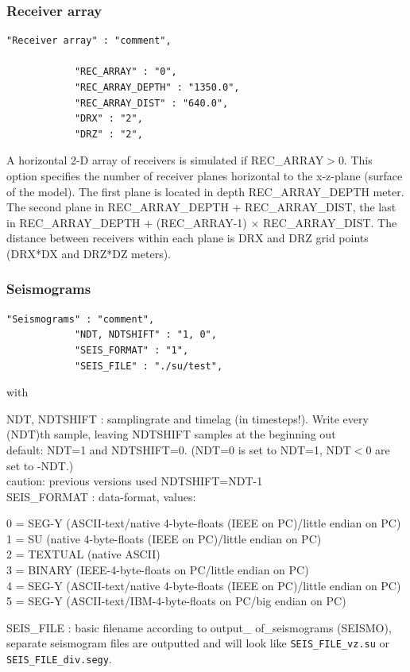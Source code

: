 \documentclass[11pt,onecolumn,oneside]{article}
\begin{document}
\subsubsection{Receiver array}
\begin{verbatim}
"Receiver array" : "comment",

            "REC_ARRAY" : "0",
            "REC_ARRAY_DEPTH" : "1350.0",
            "REC_ARRAY_DIST" : "640.0", 
            "DRX" : "2",
            "DRZ" : "2",
\end{verbatim}

A horizontal 2-D array of receivers is simulated if REC\_ARRAY$>$0. This option specifies the number of receiver planes horizontal to the x-z-plane (surface of the model). The first plane is located in depth REC\_ARRAY\_DEPTH meter. The second plane in REC\_ARRAY\_DEPTH + REC\_ARRAY\_DIST, the last in REC\_ARRAY\_DEPTH + (REC\_ARRAY-1) $\times$ REC\_ARRAY\_DIST. The distance between receivers within each plane is DRX and DRZ grid points (DRX*DX and DRZ*DZ meters).

\subsubsection{Seismograms}
\label{seismograms}
\begin{verbatim}
"Seismograms" : "comment",
            "NDT, NDTSHIFT" : "1, 0",
            "SEIS_FORMAT" : "1",
            "SEIS_FILE" : "./su/test",
\end{verbatim}

with

NDT, NDTSHIFT : samplingrate and timelag (in timesteps!). Write every (NDT)th sample, leaving NDTSHIFT samples at the beginning out\\
default: NDT=1 and NDTSHIFT=0. (NDT=0 is set to NDT=1, NDT$<$0 are set to -NDT.)\\
caution: previous versions used NDTSHIFT=NDT-1\\
SEIS\_FORMAT : data-format, values:
\par
\begingroup
\leftskip=0.5cm
0 = SEG-Y (ASCII-text/native 4-byte-floats (IEEE on PC)/little endian on PC)\\
1 = SU (native 4-byte-floats (IEEE on PC)/little endian on PC)\\
2 = TEXTUAL (native ASCII)\\
3 = BINARY (IEEE-4-byte-floats on PC/little endian on PC)\\
4 = SEG-Y (ASCII-text/native 4-byte-floats (IEEE on PC)/little endian on PC)\\
5 = SEG-Y (ASCII-text/IBM-4-byte-floats on PC/big endian on PC) \\
\par
\endgroup
SEIS\_FILE : basic filename according to output\_ of\_seismograms (SEISMO), separate seismogram files are outputted and will look like  \lstinline{SEIS_FILE_vz.su} or  \lstinline{SEIS_FILE_div.segy}.
\end{document}
